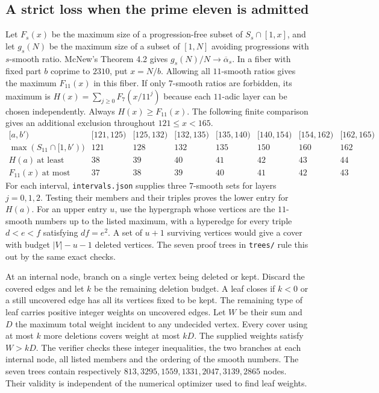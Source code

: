 \subsection*{A strict loss when the prime eleven is admitted}
Let $F_s(x)$ be the maximum size of a progression-free subset of
$S_s\cap[1,x]$, and let $g_s(N)$ be the maximum size of a subset of
$[1,N]$ avoiding progressions with $s$-smooth ratio.
McNew's Theorem 4.2 gives $g_s(N)/N\to\overline\alpha_s$.
In a fiber with fixed part $b$ coprime to $2310$, put $x=N/b$.
Allowing all $11$-smooth ratios gives the maximum $F_{11}(x)$ in this
fiber. If only $7$-smooth ratios are forbidden, its maximum is
$H(x)=\sum_{j\ge0}F_7(x/11^j)$ because each $11$-adic layer can be
chosen independently. Always $H(x)\ge F_{11}(x)$.
The following finite comparison gives an additional exclusion throughout
$121\le x<165$.
\[
\begin{array}{c|rrrrrrr}
 [a,b') &[121,125)&[125,132)&[132,135)&[135,140)&[140,154)&[154,162)&[162,165)\\
 \hline
 \max(S_{11}\cap[1,b')) &121&128&132&135&150&160&162\\
 H(a)\ \text{at least} &38&39&40&41&42&43&44\\
 F_{11}(x)\ \text{at most} &37&38&39&40&41&42&43
\end{array}
\]
For each interval, \texttt{intervals.json} supplies three $7$-smooth
sets for layers $j=0,1,2$. Testing their members and their triples
proves the lower entry for $H(a)$. For an upper entry $u$, use the
hypergraph whose vertices are the $11$-smooth numbers up to the listed
maximum, with a hyperedge for every triple $d<e<f$ satisfying $df=e^2$.
A set of $u+1$ surviving vertices would give a cover with budget
$|V|-u-1$ deleted vertices. The seven proof trees in \texttt{trees/}
rule this out by the same exact checks.

At an internal node, branch on a single vertex being deleted or kept.
Discard the covered edges and let $k$ be the remaining deletion budget.
A leaf closes if $k<0$ or a still uncovered edge has all its vertices
fixed to be kept. The remaining type of leaf carries positive integer
weights on uncovered edges. Let $W$ be their sum and $D$ the maximum
total weight incident to any undecided vertex. Every cover using at most
$k$ more deletions covers weight at most $kD$. The supplied weights
satisfy $W>kD$. The verifier checks these integer inequalities, the
two branches at each internal node, all listed members and the
ordering of the smooth numbers. The seven trees contain respectively
$813,3295,1559,1331,2047,3139,2865$ nodes. Their validity is independent
of the numerical optimizer used to find leaf weights.

